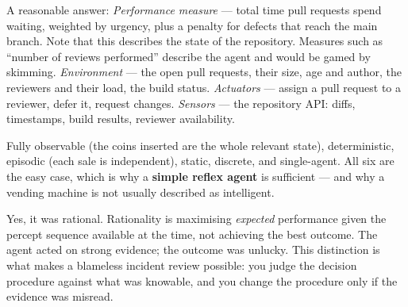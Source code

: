 \begin{ans}
  \item A reasonable answer: \emph{Performance measure} --- total time pull
        requests spend waiting, weighted by urgency, plus a penalty for defects
        that reach the main branch. Note that this describes the state of the
        repository. Measures such as ``number of reviews performed'' describe the
        agent and would be gamed by skimming. \emph{Environment} --- the open pull
        requests, their size, age and author, the reviewers and their load, the
        build status. \emph{Actuators} --- assign a pull request to a reviewer,
        defer it, request changes. \emph{Sensors} --- the repository API: diffs,
        timestamps, build results, reviewer availability.
  \item Fully observable (the coins inserted are the whole relevant state),
        deterministic, episodic (each sale is independent), static, discrete, and
        single-agent. All six are the easy case, which is why a \textbf{simple
        reflex agent} is sufficient --- and why a vending machine is not usually
        described as intelligent.
  \item Yes, it was rational. Rationality is maximising \emph{expected} performance
        given the percept sequence available at the time, not achieving the best
        outcome. The agent acted on strong evidence; the outcome was unlucky. This
        distinction is what makes a blameless incident review possible: you judge
        the decision procedure against what was knowable, and you change the
        procedure only if the evidence was misread.
\end{ans}

